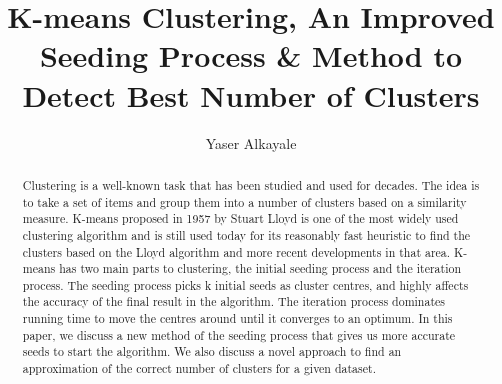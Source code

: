 \documentclass[12pt]{dalthesis}
\DeclarePairedDelimiter\abs{\lvert}{\rvert}%
\DeclarePairedDelimiter\norm{\lVert}{\rVert}%
\begin{document}
\makeatletter
\let\oldabs\abs
\def\abs{\@ifstar{\oldabs}{\oldabs*}}
%
\let\oldnorm\norm
\def\norm{\@ifstar{\oldnorm}{\oldnorm*}}
\makeatother
\newcommand*{\Value}{\frac{1}{2}x^2}%


\title{K-means Clustering, An Improved Seeding Process & Method to Detect Best Number of Clusters }
\author{Yaser Alkayale}

\bcshon  %





\nolistoftables

\frontmatter

\begin{abstract}
  \paragraph{}
  Clustering is a well-known task that has been studied and used for decades. The idea is to take a set of items and group them into a number of clusters based on a similarity measure. K-means proposed in 1957 by Stuart Lloyd is one of the most widely used clustering algorithm and is still used today for its reasonably fast heuristic to find the clusters based on the Lloyd algorithm and more recent developments in that area. K-means has two main parts to clustering, the initial seeding process and the iteration process. The seeding process picks k initial seeds as cluster centres, and highly affects the accuracy of the final result in the algorithm. The iteration process dominates running time to move the centres around until it converges to an optimum. In this paper, we discuss a new method of the seeding process that gives us more accurate seeds to start the algorithm. We also discuss a novel approach to find an approximation of the correct number of clusters for a given dataset.
\end{abstract}
\end{document}
